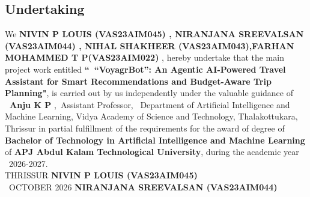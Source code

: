 %
%
%
%
%
%


\begin{titlepage}



\chapter*{\centering Undertaking}
%


\doublespacing We {\bf  NIVIN P LOUIS (VAS23AIM045) , NIRANJANA SREEVALSAN (VAS23AIM044) , NIHAL SHAKHEER (VAS23AIM043),FARHAN MOHAMMED T P(VAS23AIM022) }, hereby undertake that the main project work entitled {\bf ``\ “VoyagrBot”: An Agentic AI-Powered Travel Assistant
for Smart Recommendations and Budget-Aware Trip
Planning"}, is carried out by us independently under the valuable guidance of {\bf \ Anju K P },\ Assistant Professor, \ Department of Artificial Intelligence and Machine Learning, Vidya Academy of Science and Technology, Thalakottukara, Thrissur in partial fulfillment of the requirements for the award of degree of {\bf Bachelor of Technology in Artificial Intelligence and Machine Learning} of {\bf APJ Abdul Kalam Technological University}, during the academic year \ 2026-2027.\\[5 cm]

\noindent THRISSUR \hfill \textbf {NIVIN P LOUIS (VAS23AIM045)}\\
\ OCTOBER 2026 \hfill  \textbf{ NIRANJANA SREEVALSAN (VAS23AIM044)}\\ 
\textbf{}\\
\textbf{}\\


\end{titlepage}




